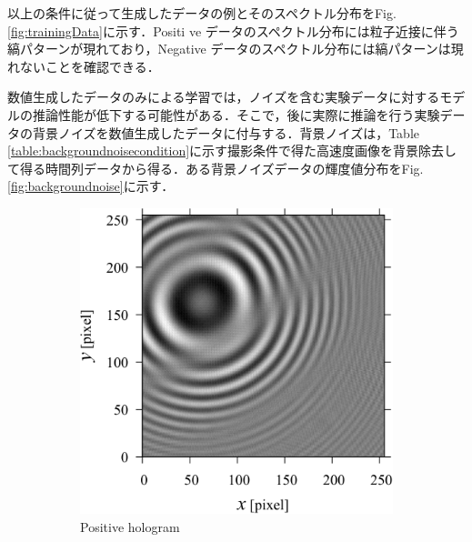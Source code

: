 以上の条件に従って生成したデータの例とそのスペクトル分布をFig. \ref{fig:trainingData}に示す．Positi
ve データのスペクトル分布には粒子近接に伴う縞パターンが現れており，Negative データのスペクトル分布には縞パターンは現れないことを確認できる．

数値生成したデータのみによる学習では，ノイズを含む実験データに対するモデルの推論性能が低下する可能性がある．そこで，後に実際に推論を行う実験データの背景ノイズを数値生成したデータに付与する．背景ノイズは，Table \ref{table:backgroundnoisecondition}に示す撮影条件で得た高速度画像を背景除去して得る時間列データから得る．ある背景ノイズデータの輝度値分布をFig. \ref{fig:backgroundnoise}に示す．

\begin{figure}[H]
    \centering
    \begin{subfigure}[t]{0.45\linewidth}
        \includegraphics[width=\linewidth]{./Figure/3_Methods/close1.pdf}
        \caption{Positive hologram}
        \label{fig:trainingData:posiholo}
    \end{subfigure}
    \hfill
    \begin{subfigure}[t]{0.45\linewidth}

\end{subfigure}
\end{figure}
